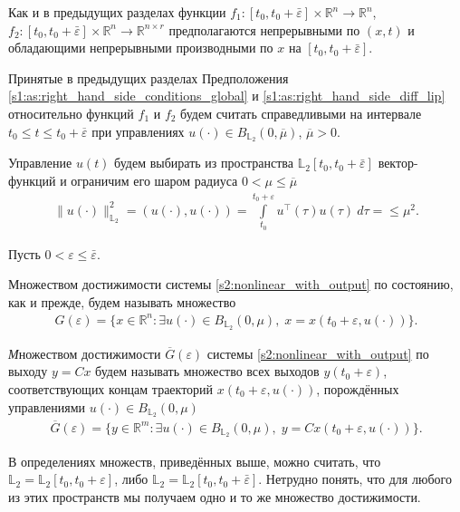 \documentclass[../main.tex]{subfiles}
\begin{document}
Как и в предыдущих разделах функции $ f_1: [t_0, t_0 + \bar{\varepsilon}] \times \mathbb{R}^{n} \rightarrow \mathbb{R}^{n} $, $ f_2: [t_0, t_0 + \bar{\varepsilon}] \times \mathbb{R}^{n} \rightarrow \mathbb{R}^{n \times r} $ предполагаются непрерывными по $(x, t)$ и обладающими непрерывными производными по $x$ на $ [t_0, t_0 + \bar{\varepsilon}]$. 

Принятые в предыдущих разделах Предположения \ref{s1:as:right_hand_side_conditions_global} и \ref{s1:as:right_hand_side_diff_lip} относительно функций $f_1$ и $f_2$ будем считать справедливыми на интервале $t_0 \leqslant t \leqslant t_0 + \overline{\varepsilon} $ при управлениях $u(\cdot) \in B_{\mathbb{L}_2}(0, \overline{\mu}) $, $\overline{\mu} > 0$.

 Управление $u(t)$ будем выбирать из
пространства $\mathbb{L}_2[t_0,t_0+\bar{\varepsilon}]$ вектор-функций и ограничим его шаром радиуса $ 0 < \mu \leqslant \overline{\mu} $
\begin{gather}\label{s2:constrY}
    \lVert u(\cdot)\rVert^2_{\mathbb{L}_2} = \left(u(\cdot),u(\cdot) \right) = \int\limits_{t_0}^{t_0 + \varepsilon} u^{\top}(\tau) u(\tau) \ d\tau = \leqslant \mu^2.
\end{gather}

Пусть $ 0 <  \varepsilon \leqslant \bar{\varepsilon} $. 

Множеством достижимости системы \eqref{s2:nonlinear_with_output} по состоянию, как и прежде, будем называть множество 
\begin{gather*}
    G(\varepsilon)=\{x\in \mathbb{R}^n:\exists u(\cdot)\in B_{\mathbb{L}_2}(0,\mu),\; x=x(t_0+\varepsilon, u(\cdot))\}.
\end{gather*}


\begin{definition}
    {\textit Множеством достижимости $\overline{G}(\varepsilon)$ системы \eqref{s2:nonlinear_with_output} по выходу} $ y = C x $ будем называть множество всех выходов $ y(t_0+\varepsilon) $,
    соответствующих концам траекторий $ x(t_0+\varepsilon, u(\cdot)) $, порождённых управлениями $ u(\cdot) \in B_{\mathbb{L}_2}(0,\mu)$
    \begin{gather*}
        \overline{G}(\varepsilon)=\{y\in \mathbb{R}^m:\exists u(\cdot)\in B_{\mathbb{L}_2}(0,\mu),\; y=Cx(t_0+\varepsilon, u(\cdot))\}.
    \end{gather*}
\end{definition}

В определениях множеств, приведённых выше, можно считать, что $ \mathbb{L}_2 =\mathbb{L}_2[t_0,t_0+\varepsilon] $, либо  $ \mathbb{L}_2=\mathbb{L}_2[t_0,t_0+\bar{\varepsilon}] $.
Нетрудно понять, что для любого из этих пространств мы получаем одно и то же множество достижимости. 
    
\end{document}
